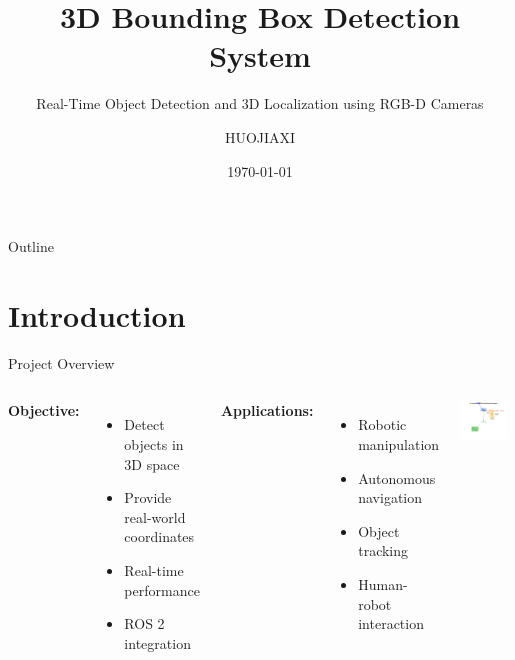 \documentclass[aspectratio=169]{beamer}
\title{3D Bounding Box Detection System}
\subtitle{Real-Time Object Detection and 3D Localization using RGB-D Cameras}
\author{HUOJIAXI}
\institute{ROS 2 Humble + YOLO + Point Cloud Processing}
\date{\today}
\begin{document}
\begin{frame}
\titlepage
\end{frame}

\begin{frame}{Outline}
\tableofcontents
\end{frame}

\section{Introduction}

\begin{frame}{Project Overview}
\begin{columns}
\textbf{Objective:}
\begin{itemize}
    \item Detect objects in 3D space
    \item Provide real-world coordinates
    \item Real-time performance
    \item ROS 2 integration
\end{itemize}

\vspace{1em}
\textbf{Applications:}
\begin{itemize}
    \item Robotic manipulation
    \item Autonomous navigation
    \item Object tracking
    \item Human-robot interaction
\end{itemize}

\begin{center}
    \includegraphics[width=0.9\textwidth]{coordinate_system.png}
\end{center}
\end{columns}
\end{frame}
\end{document}
